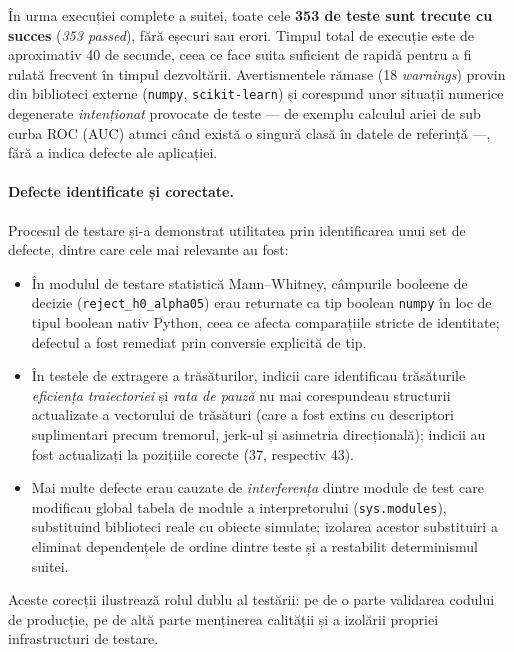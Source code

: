 În urma execuției complete a suitei, toate cele \textbf{353 de teste sunt
trecute cu succes} (\emph{353 passed}), fără eșecuri sau erori. Timpul total de
execuție este de aproximativ 40 de secunde, ceea ce face suita suficient de
rapidă pentru a fi rulată frecvent în timpul dezvoltării. Avertismentele rămase
(18 \emph{warnings}) provin din biblioteci externe (\texttt{numpy},
\texttt{scikit-learn}) și corespund unor situații numerice degenerate
\emph{intenționat} provocate de teste --- de exemplu calculul ariei de sub
curba ROC (AUC) atunci când există o singură clasă în datele de referință ---,
fără a indica defecte ale aplicației.

\paragraph{Defecte identificate și corectate.} Procesul de testare și-a
demonstrat utilitatea prin identificarea unui set de defecte, dintre care cele
mai relevante au fost:

\begin{itemize}
  \item În modulul de testare statistică Mann--Whitney, câmpurile booleene de
        decizie (\texttt{reject\_h0\_alpha05}) erau returnate ca tip boolean
        \texttt{numpy} în loc de tipul boolean nativ Python, ceea ce afecta
        comparațiile stricte de identitate; defectul a fost remediat prin
        conversie explicită de tip.
  \item În testele de extragere a trăsăturilor, indicii care identificau
        trăsăturile \emph{eficiența traiectoriei} și \emph{rata de pauză} nu mai
        corespundeau structurii actualizate a vectorului de trăsături (care a
        fost extins cu descriptori suplimentari precum tremorul, jerk-ul și
        asimetria direcțională); indicii au fost actualizați la pozițiile
        corecte (37, respectiv 43).
  \item Mai multe defecte erau cauzate de \emph{interferența} dintre module de
        test care modificau global tabela de module a interpretorului
        (\texttt{sys.modules}), substituind biblioteci reale cu obiecte
        simulate; izolarea acestor substituiri a eliminat dependențele de ordine
        dintre teste și a restabilit determinismul suitei.
\end{itemize}

Aceste corecții ilustrează rolul dublu al testării: pe de o parte validarea
codului de producție, pe de altă parte menținerea calității și a izolării
propriei infrastructuri de testare.

